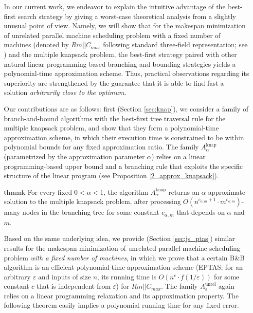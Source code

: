 \documentclass[moor,sglanonrev]{informs4}
\theoremstyle{plain}
\begin{document}
In our current work, we endeavor to explain the intuitive advantage of the best-first search strategy by giving a worst-case theoretical analysis from a slightly unusual point of view. Namely, we will show that for the makespan minimization of unrelated parallel machine scheduling problem with a fixed number of machines (denoted by $Rm||C_{max}$ following standard three-field representation; see \cite{machine_scheduling_review}) and the multiple knapsack problem, the best-first strategy paired with other natural linear programming-based branching and bounding strategies yields a polynomial-time approximation scheme. Thus, practical observations regarding its superiority are strengthened by the guarantee that it is able to find fast a solution \emph{arbitrarily close to the optimum}.

Our contributions are as follows: first (Section \ref{sec:knap}), we consider a family of branch-and-bound algorithms with the best-first tree traversal rule for the multiple knapsack problem, and show that they form a polynomial-time approximation scheme, in which their execution time is constrained to be within polynomial bounds for any fixed approximation ratio. The family $A^{\text{knap}}_{\alpha}$ (parametrized by the approximation parameter $\alpha$) relies on a linear programming-based upper bound and a branching rule that exploits the specific structure of the linear program (see Proposition \ref{2_approx_knapsack}).

\begin{restatable*}{thm}{mk}\label{multi_knapsack_ptas}
    For every fixed $0< \alpha < 1$, the algorithm $A^{\text{knap}}_{\alpha}$ returns an $\alpha$-approximate solution to the multiple knapsack problem, after processing $O(n^{c_{\alpha,m}+1} \cdot m^{c_{\alpha,m}})$-many nodes in the branching tree for some constant $c_{\alpha, m}$ that depends on $\alpha$ and $m$.
\end{restatable*}

Based on the same underlying idea, we provide (Section \ref{sec:js_ptas}) similar results for the makespan minimization of unrelated parallel machine scheduling problem \emph{with a fixed number of machines}, in which we prove that a certain B\&B algorithm is an efficient polynomial-time approximation scheme (EPTAS; for an arbitrary $\varepsilon$ and inputs of size $n$, its running time is $O(n^c \cdot f(1/\varepsilon))$ for some constant $c$ that is independent from $\varepsilon$) for $Rm||C_{max}$. The family $A^{\text{unrel}}_{\varepsilon}$ again relies on a linear programming relaxation and its approximation property. The following theorem  easily implies a polynomial running time for any fixed error.
\end{document}
